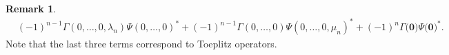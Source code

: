 \documentclass[12pt]{amsart}
\theoremstyle{definition}
\newtheorem{rem}{Remark}[section]
\newcommand{\1}{{\mbox{\bf 1}}}
\begin{document}
\begin{rem}
\begin{align*}
&(-1)^{n-1} \Gamma(0,\ldots,0,\lambda_n) \Psi(0,\ldots,0)^* 
+ (-1)^{n-1} \Gamma(0,\ldots,0) \Psi(0,\ldots,0,\mu_n)^* + (-1)^n \Gamma \big(\bm{0} \big) \Psi \big(\bm{0} \big)^*.
\end{align*}
Note that the last three terms correspond to Toeplitz operators. 

\end{rem}
\end{document}
